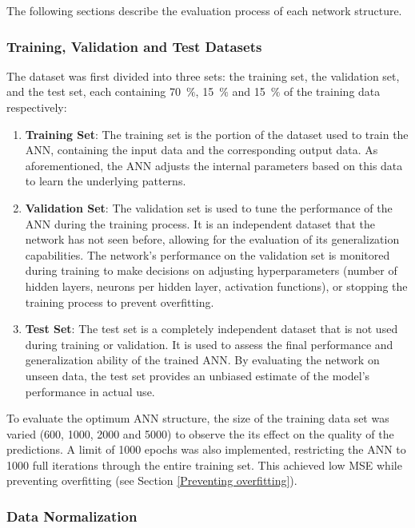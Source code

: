 The following sections describe the evaluation process of each network structure.

\subsubsection{Training, Validation and Test Datasets}

The dataset was first divided into three sets: the training set, the validation set, and the test set, each containing 70~$\%$, 15~$\%$ and 15~$\%$ of the training data respectively:

\begin{enumerate}
	\item \textbf{Training Set}: The training set is the portion of the dataset used to train the ANN, containing the input data and the corresponding output data. As aforementioned, the ANN adjusts the internal parameters based on this data to learn the underlying patterns.
	\item \textbf{Validation Set}: The validation set is used to tune the performance of the ANN during the training process. It is an independent dataset that the network has not seen before, allowing for the evaluation of its generalization capabilities. The network's performance on the validation set is monitored during training to make decisions on adjusting hyperparameters (number of hidden layers, neurons per hidden layer, activation functions), or stopping the training process to prevent overfitting.
	\item \textbf{Test Set}: The test set is a completely independent dataset that is not used during training or validation. It is used to assess the final performance and generalization ability of the trained ANN. By evaluating the network on unseen data, the test set provides an unbiased estimate of the model's performance in actual use.
\end{enumerate}

To evaluate the optimum ANN structure, the size of the training data set was varied (600, 1000, 2000 and 5000) to observe the its effect on the quality of the predictions. A limit of 1000 epochs was also implemented, restricting the ANN to 1000 full iterations through the entire training set. This achieved low MSE while preventing overfitting (see Section \ref{Preventing overfitting}).

\subsubsection{Data Normalization}

